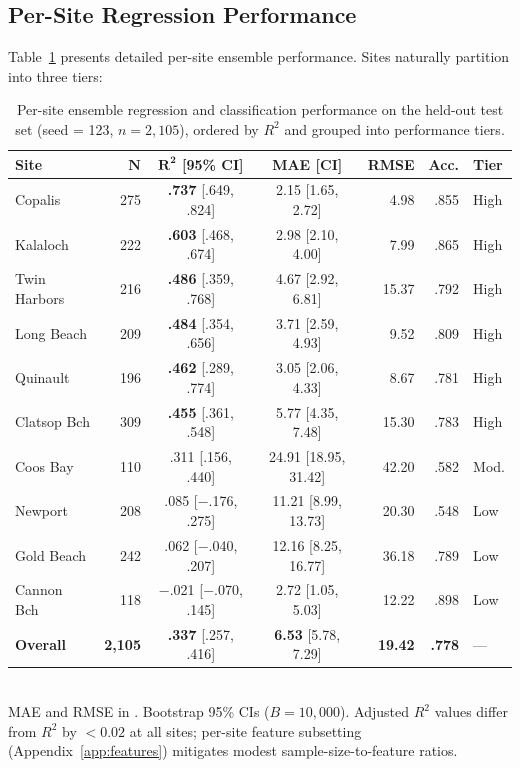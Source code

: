 \documentclass[toxins,article,submit,moreauthors]{Definitions/mdpi}
\begin{document}
\subsection{Per-Site Regression Performance}
\label{sec:results-per-site}

Table~\ref{tab:per-site-results} presents detailed per-site ensemble performance. Sites naturally partition into three tiers:

\begin{table}[H]
\caption{Per-site ensemble regression and classification performance on the held-out test set (seed = 123, $n = 2{,}105$), ordered by $R^2$ and grouped into performance tiers.}
\label{tab:per-site-results}
\centering\scriptsize
\begin{tabular*}{\linewidth}{@{\extracolsep{\fill}}lrccrrl}
\toprule
\textbf{Site} & $\boldsymbol{N}$ & $\boldsymbol{R^2}$ \textbf{[95\% CI]} & \textbf{MAE [CI]} & \textbf{RMSE} & \textbf{Acc.} & \textbf{Tier} \\
\midrule
Copalis       & 275 & \textbf{.737} [.649, .824] & 2.15 [1.65, 2.72] & 4.98  & .855 & High \\
Kalaloch      & 222 & \textbf{.603} [.468, .674] & 2.98 [2.10, 4.00] & 7.99  & .865 & High \\
Twin Harbors  & 216 & \textbf{.486} [.359, .768] & 4.67 [2.92, 6.81] & 15.37 & .792 & High \\
Long Beach    & 209 & \textbf{.484} [.354, .656] & 3.71 [2.59, 4.93] & 9.52  & .809 & High \\
Quinault      & 196 & \textbf{.462} [.289, .774] & 3.05 [2.06, 4.33] & 8.67  & .781 & High \\
Clatsop Bch   & 309 & \textbf{.455} [.361, .548] & 5.77 [4.35, 7.48] & 15.30 & .783 & High \\
\addlinespace
Coos Bay      & 110 & .311 [.156, .440] & 24.91 [18.95, 31.42] & 42.20 & .582 & Mod. \\
\addlinespace
Newport       & 208 & .085 [$-$.176, .275] & 11.21 [8.99, 13.73] & 20.30 & .548 & Low \\
Gold Beach    & 242 & .062 [$-$.040, .207] & 12.16 [8.25, 16.77] & 36.18 & .789 & Low \\
Cannon Bch    & 118 & $-$.021 [$-$.070, .145] & 2.72 [1.05, 5.03] & 12.22 & .898 & Low \\
\midrule
\textbf{Overall} & \textbf{2,105} & \textbf{.337} [.257, .416] & \textbf{6.53} [5.78, 7.29] & \textbf{19.42} & \textbf{.778} & --- \\
\bottomrule
\end{tabular*}
\vspace{0.3em}\\
\footnotesize{MAE and RMSE in \si{\microgrampeg}. Bootstrap 95\% CIs ($B = 10{,}000$). Adjusted $R^2$ values differ from $R^2$ by $< 0.02$ at all sites; per-site feature subsetting (Appendix~\ref{app:features}) mitigates modest sample-size-to-feature ratios.}
\end{table}
\end{document}
